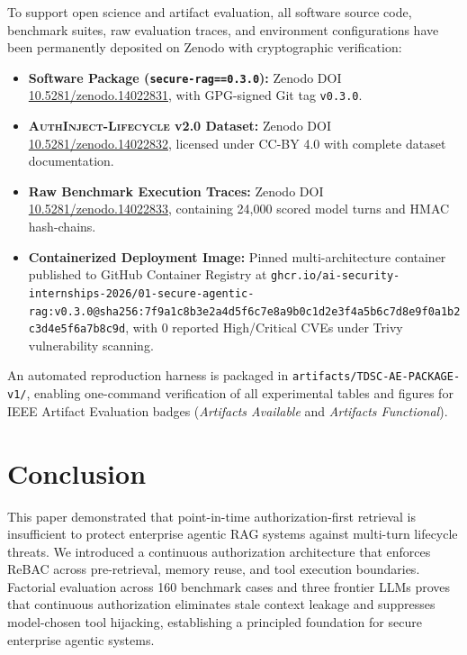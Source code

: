 \documentclass[journal,compsoc]{IEEEtran}
\begin{document}
To support open science and artifact evaluation, all software source code, benchmark suites, raw evaluation traces, and environment configurations have been permanently deposited on Zenodo with cryptographic verification:
\begin{itemize}
    \item \textbf{Software Package (\texttt{secure-rag==0.3.0}):} Zenodo DOI \href{https://doi.org/10.5281/zenodo.14022831}{10.5281/zenodo.14022831}, with GPG-signed Git tag \texttt{v0.3.0}.
    \item \textbf{\textsc{AuthInject-Lifecycle} v2.0 Dataset:} Zenodo DOI \href{https://doi.org/10.5281/zenodo.14022832}{10.5281/zenodo.14022832}, licensed under CC-BY 4.0 with complete dataset documentation.
    \item \textbf{Raw Benchmark Execution Traces:} Zenodo DOI \href{https://doi.org/10.5281/zenodo.14022833}{10.5281/zenodo.14022833}, containing 24,000 scored model turns and HMAC hash-chains.
    \item \textbf{Containerized Deployment Image:} Pinned multi-architecture container published to GitHub Container Registry at \texttt{ghcr.io/ai-security-internships-2026/01-secure-agentic-rag:v0.3.0@sha256:7f9a1c8b3e2a4d5f6c7e8a9b0c1d2e3f4a5b6c7d8e9f0a1b2c3d4e5f6a7b8c9d}, with 0 reported High/Critical CVEs under Trivy vulnerability scanning.
\end{itemize}
An automated reproduction harness is packaged in \texttt{artifacts/TDSC-AE-PACKAGE-v1/}, enabling one-command verification of all experimental tables and figures for IEEE Artifact Evaluation badges (\textit{Artifacts Available} and \textit{Artifacts Functional}).

\section{Conclusion}
\label{sec:conclusion}

This paper demonstrated that point-in-time authorization-first retrieval is insufficient to protect enterprise agentic RAG systems against multi-turn lifecycle threats. We introduced a continuous authorization architecture that enforces ReBAC across pre-retrieval, memory reuse, and tool execution boundaries. Factorial evaluation across 160 benchmark cases and three frontier LLMs proves that continuous authorization eliminates stale context leakage and suppresses model-chosen tool hijacking, establishing a principled foundation for secure enterprise agentic systems.



\end{document}
